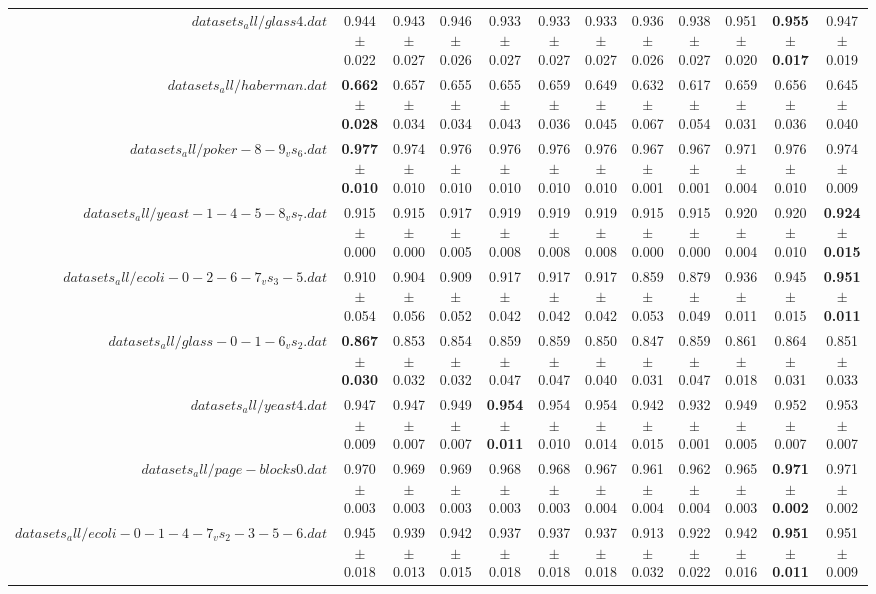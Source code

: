\begin{table}[!ht]
{\begin{tabular}{r c c c c c c c c c c c}
$datasets_all/glass4.dat$ & 0.944 $\pm$ 0.022 & 0.943 $\pm$ 0.027 & 0.946 $\pm$ 0.026 & 0.933 $\pm$ 0.027 & 0.933 $\pm$ 0.027 & 0.933 $\pm$ 0.027 & 0.936 $\pm$ 0.026 & 0.938 $\pm$ 0.027 & 0.951 $\pm$ 0.020 & \textbf{0.955 $\pm$ 0.017} & 0.947 $\pm$ 0.019 \\
$datasets_all/haberman.dat$ & \textbf{0.662 $\pm$ 0.028} & 0.657 $\pm$ 0.034 & 0.655 $\pm$ 0.034 & 0.655 $\pm$ 0.043 & 0.659 $\pm$ 0.036 & 0.649 $\pm$ 0.045 & 0.632 $\pm$ 0.067 & 0.617 $\pm$ 0.054 & 0.659 $\pm$ 0.031 & 0.656 $\pm$ 0.036 & 0.645 $\pm$ 0.040 \\
$datasets_all/poker-8-9_vs_6.dat$ & \textbf{0.977 $\pm$ 0.010} & 0.974 $\pm$ 0.010 & 0.976 $\pm$ 0.010 & 0.976 $\pm$ 0.010 & 0.976 $\pm$ 0.010 & 0.976 $\pm$ 0.010 & 0.967 $\pm$ 0.001 & 0.967 $\pm$ 0.001 & 0.971 $\pm$ 0.004 & 0.976 $\pm$ 0.010 & 0.974 $\pm$ 0.009 \\
$datasets_all/yeast-1-4-5-8_vs_7.dat$ & 0.915 $\pm$ 0.000 & 0.915 $\pm$ 0.000 & 0.917 $\pm$ 0.005 & 0.919 $\pm$ 0.008 & 0.919 $\pm$ 0.008 & 0.919 $\pm$ 0.008 & 0.915 $\pm$ 0.000 & 0.915 $\pm$ 0.000 & 0.920 $\pm$ 0.004 & 0.920 $\pm$ 0.010 & \textbf{0.924 $\pm$ 0.015} \\
$datasets_all/ecoli-0-2-6-7_vs_3-5.dat$ & 0.910 $\pm$ 0.054 & 0.904 $\pm$ 0.056 & 0.909 $\pm$ 0.052 & 0.917 $\pm$ 0.042 & 0.917 $\pm$ 0.042 & 0.917 $\pm$ 0.042 & 0.859 $\pm$ 0.053 & 0.879 $\pm$ 0.049 & 0.936 $\pm$ 0.011 & 0.945 $\pm$ 0.015 & \textbf{0.951 $\pm$ 0.011} \\
$datasets_all/glass-0-1-6_vs_2.dat$ & \textbf{0.867 $\pm$ 0.030} & 0.853 $\pm$ 0.032 & 0.854 $\pm$ 0.032 & 0.859 $\pm$ 0.047 & 0.859 $\pm$ 0.047 & 0.850 $\pm$ 0.040 & 0.847 $\pm$ 0.031 & 0.859 $\pm$ 0.047 & 0.861 $\pm$ 0.018 & 0.864 $\pm$ 0.031 & 0.851 $\pm$ 0.033 \\
$datasets_all/yeast4.dat$ & 0.947 $\pm$ 0.009 & 0.947 $\pm$ 0.007 & 0.949 $\pm$ 0.007 & \textbf{0.954 $\pm$ 0.011} & 0.954 $\pm$ 0.010 & 0.954 $\pm$ 0.014 & 0.942 $\pm$ 0.015 & 0.932 $\pm$ 0.001 & 0.949 $\pm$ 0.005 & 0.952 $\pm$ 0.007 & 0.953 $\pm$ 0.007 \\
$datasets_all/page-blocks0.dat$ & 0.970 $\pm$ 0.003 & 0.969 $\pm$ 0.003 & 0.969 $\pm$ 0.003 & 0.968 $\pm$ 0.003 & 0.968 $\pm$ 0.003 & 0.967 $\pm$ 0.004 & 0.961 $\pm$ 0.004 & 0.962 $\pm$ 0.004 & 0.965 $\pm$ 0.003 & \textbf{0.971 $\pm$ 0.002} & 0.971 $\pm$ 0.002 \\
$datasets_all/ecoli-0-1-4-7_vs_2-3-5-6.dat$ & 0.945 $\pm$ 0.018 & 0.939 $\pm$ 0.013 & 0.942 $\pm$ 0.015 & 0.937 $\pm$ 0.018 & 0.937 $\pm$ 0.018 & 0.937 $\pm$ 0.018 & 0.913 $\pm$ 0.032 & 0.922 $\pm$ 0.022 & 0.942 $\pm$ 0.016 & \textbf{0.951 $\pm$ 0.011} & 0.951 $\pm$ 0.009 \\

\end{tabular}}
\end{table}
